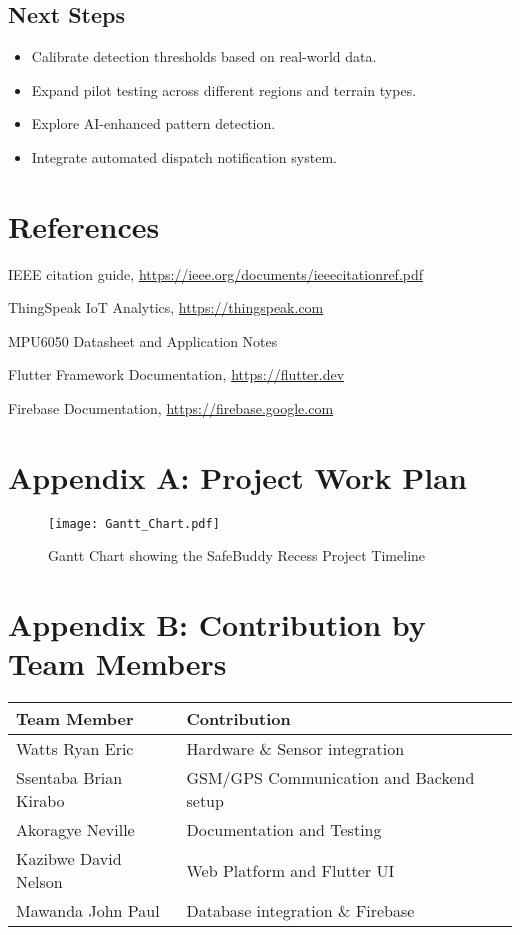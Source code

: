 \documentclass[12pt]{article}
\begin{document}
\subsection{Next Steps}
\begin{itemize}
  \item Calibrate detection thresholds based on real-world data.
  \item Expand pilot testing across different regions and terrain types.
  \item Explore AI-enhanced pattern detection.
  \item Integrate automated dispatch notification system.
\end{itemize}

\section*{References}
\begin{thebibliography}{9}

 IEEE citation guide, \url{https://ieee.org/documents/ieeecitationref.pdf}

 ThingSpeak IoT Analytics, \url{https://thingspeak.com}

 MPU6050 Datasheet and Application Notes

 Flutter Framework Documentation, \url{https://flutter.dev}

 Firebase Documentation, \url{https://firebase.google.com}

\end{thebibliography}

\section*{Appendix A: Project Work Plan}

\begin{figure}[H]
  \centering
  \texttt{[image: Gantt\_Chart.pdf]}
  \caption{Gantt Chart showing the SafeBuddy Recess Project Timeline}
  \label{fig:gantt}
\end{figure}

\section*{Appendix B: Contribution by Team Members}
\begin{longtable}{@{}ll@{}}
\toprule
\textbf{Team Member} & \textbf{Contribution} \\
\midrule
Watts Ryan Eric & Hardware \& Sensor integration \\
Ssentaba Brian Kirabo & GSM/GPS Communication and Backend setup \\
Akoragye Neville & Documentation and Testing \\
Kazibwe David Nelson & Web Platform and Flutter UI \\
Mawanda John Paul & Database integration \& Firebase \\
\bottomrule
\end{longtable}
\end{document}
